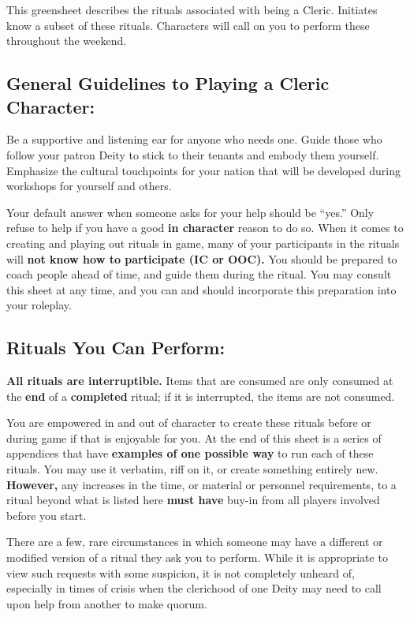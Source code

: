 \documentclass[green]{GL2020}
\begin{document}
\name{\gFPFInitiate{}}

This greensheet describes the rituals associated with being a Cleric. Initiates know a subset of these rituals. Characters will call on you to perform these throughout the weekend. 

\subsection*{General Guidelines to Playing a Cleric Character:}
Be a supportive and listening ear for anyone who needs one. Guide those who follow your patron Deity to stick to their tenants and embody them yourself. Emphasize the cultural touchpoints for your nation that will be developed during workshops for yourself and others.

Your default answer when someone asks for your help should be ``yes.'' Only refuse to help if you have a good \textbf{in character} reason to do so. When it comes to creating and playing out rituals in game, many of your participants in the rituals will \textbf{not know how to participate (IC or OOC).} You should be prepared to coach people ahead of time, and guide them during the ritual. You may consult this sheet at any time, and you can and should incorporate this preparation into your roleplay.

\subsection*{Rituals You Can Perform:}
\textbf{All rituals are interruptible.} Items that are consumed are only consumed at the \textbf{end} of a \textbf{completed} ritual; if it is interrupted, the items are not consumed.

You are empowered in and out of character to create these rituals before or during game if that is enjoyable for you. At the end of this sheet is a series of appendices that have \textbf{examples of one possible way} to run each of these rituals. You may use it verbatim, riff on it, or create something entirely new. \textbf{However,} any increases in the time, or material or personnel requirements, to a ritual beyond what is listed here \textbf{must have} buy-in from all players involved before you start.

There are a few, rare circumstances in which someone may have a different or modified version of a ritual they ask you to perform. While it is appropriate to view such requests with some suspicion, it is not completely unheard of, especially in times of crisis when the clerichood of one Deity may need to call upon help from another to make quorum.
\end{document}
